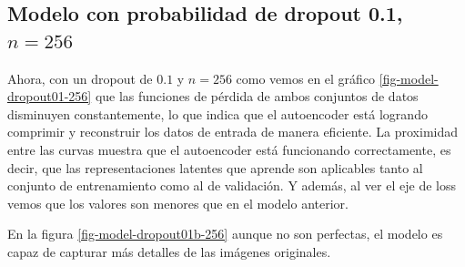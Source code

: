 \documentclass[aps,prl,reprint,groupedaddress]{revtex4-2}
\begin{document}
\subsection{Modelo con probabilidad de dropout 0.1, $n=256$}

Ahora, con un dropout de $0.1$ y $n=256$ como vemos en el gráfico 
\ref{fig-model-dropout01-256} que las funciones de pérdida de ambos conjuntos 
de datos disminuyen constantemente, lo que indica que el autoencoder está logrando 
comprimir y reconstruir los datos de entrada de manera eficiente. La proximidad 
entre las curvas muestra que el autoencoder está funcionando correctamente, 
es decir, que las representaciones latentes que aprende son aplicables tanto al 
conjunto de entrenamiento como al de validación. Y además, al ver el eje de loss 
vemos que los valores son menores que en el modelo anterior.

En la figura \ref{fig-model-dropout01b-256} aunque no son perfectas, el modelo es 
capaz de capturar más detalles de las imágenes originales.
\end{document}
